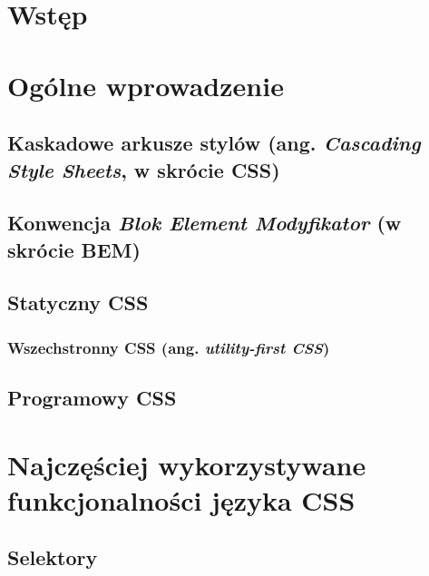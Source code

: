 \documentclass[a4paper,12pt]{book} %
\begin{document}
\sloppy



\thispagestyle{empty}


\newpage{}

\thispagestyle{empty}

\newpage{}



\tableofcontents{}






\chapter*{Wstęp}

\chapter{Ogólne wprowadzenie}
\section{Kaskadowe arkusze stylów (ang. \emph{Cascading Style Sheets}, w skrócie CSS)}
\section{Konwencja \emph{Blok Element Modyfikator} (w skrócie BEM)}
\section{Statyczny CSS}
\subsection{Wszechstronny CSS (ang. \emph{utility-first CSS})}
\section{Programowy CSS}



\chapter{Najczęściej wykorzystywane funkcjonalności języka CSS}
\section{Selektory}
\end{document}
